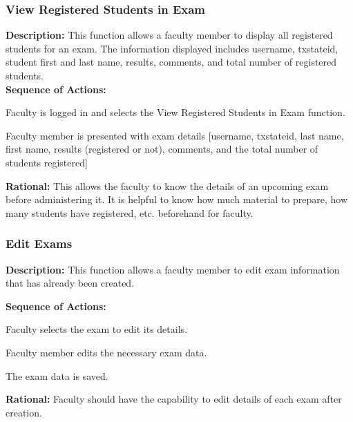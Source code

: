    \subsubsection{\large View Registered Students in Exam} 
   \begin{boxed} %
      \textbf{Description:}
      {\small This function allows a faculty member to display all registered
         students for an exam. The information displayed includes username,
         txstateid, student first and last name, results, comments, and total number
         of registered students.} \\
         
         \textbf{Sequence of Actions:}
         \begin{enumerate}
               {\small
            \item Faculty is logged in and selects the View Registered Students
               in Exam function.
            \item Faculty member is presented with exam details [username,
               txstateid, last name, first name, results (registered or not),
               comments, and the total number of students registered]}
         \end{enumerate}

         \textbf{Rational:}
         {\small This allows the faculty to know the details of an upcoming exam before
         administering it. It is helpful to know how much material to prepare,
         how many students have registered, etc. beforehand for faculty.}
   \end{boxed} %

   \subsubsection{\large Edit Exams} 
   \begin{boxed} %
      \textbf{Description:}
      {\small This function allows a faculty member to edit exam information
         that has already been created.}
         
         \textbf{Sequence of Actions:}
         \begin{enumerate}
               {\small
            \item Faculty selects the exam to edit its details.
            \item Faculty member edits the necessary exam data.
            \item The exam data is saved.}
         \end{enumerate}

         \textbf{Rational:}
         {\small Faculty should have the capability to edit details of each exam after
         creation.}
   \end{boxed} %

